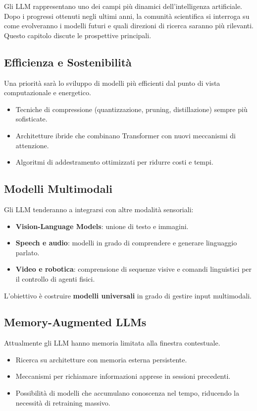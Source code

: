 Gli LLM rappresentano uno dei campi più dinamici dell'intelligenza artificiale. 
Dopo i progressi ottenuti negli ultimi anni, la comunità scientifica 
si interroga su come evolveranno i modelli futuri e quali direzioni di ricerca 
saranno più rilevanti. 
Questo capitolo discute le prospettive principali.

\subsection{Efficienza e Sostenibilità}
Una priorità sarà lo sviluppo di modelli più efficienti dal punto di vista computazionale e energetico.
\begin{itemize}
    \item Tecniche di compressione (quantizzazione, pruning, distillazione) sempre più sofisticate.
    \item Architetture ibride che combinano Transformer con nuovi meccanismi di attenzione.
    \item Algoritmi di addestramento ottimizzati per ridurre costi e tempi.
\end{itemize}

\subsection{Modelli Multimodali}
Gli LLM tenderanno a integrarsi con altre modalità sensoriali:
\begin{itemize}
    \item \textbf{Vision-Language Models}: unione di testo e immagini.
    \item \textbf{Speech e audio}: modelli in grado di comprendere e generare linguaggio parlato.
    \item \textbf{Video e robotica}: comprensione di sequenze visive e comandi linguistici per il controllo di agenti fisici.
\end{itemize}
L'obiettivo è costruire \textbf{modelli universali} in grado di gestire input multimodali.

\subsection{Memory-Augmented LLMs}
Attualmente gli LLM hanno memoria limitata alla finestra contestuale.
\begin{itemize}
    \item Ricerca su architetture con memoria esterna persistente.
    \item Meccanismi per richiamare informazioni apprese in sessioni precedenti.
    \item Possibilità di modelli che accumulano conoscenza nel tempo, riducendo la necessità di retraining massivo.
\end{itemize}

